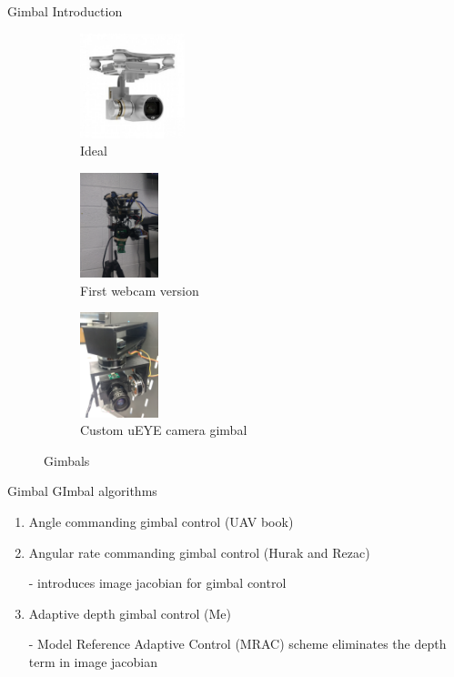 \documentclass[9pt]{beamer}
\newenvironment{figure*}%
{\begin{figure}}
{\end{figure}}
\begin{document}
\begin{frame}{Gimbal}
Introduction
	\begin{figure}[htbp]
	\centering
	\begin{subfigure}[t]{0.3\textwidth}
		\centering
		\includegraphics[height=1.2in]{phantom3_gimbal.jpg}
		\caption{Ideal}
	\end{subfigure}%
	\begin{subfigure}[t]{0.3\textwidth}
		\centering
		\includegraphics[height=1.2in]{chapter2/gimbal_webcam.jpg}
		\caption{First webcam version}
	\end{subfigure}
	\begin{subfigure}[t]{0.3\textwidth}
		\centering
		\includegraphics[height=1.2in]{chapter2/gimbal.jpg}
		\caption{Custom uEYE camera gimbal}
	\end{subfigure}
	\caption{Gimbals}
	\end{figure}
\end{frame}

\begin{frame}{Gimbal}
	GImbal algorithms
	\begin{enumerate}
		\item Angle commanding gimbal control (UAV book)
		\item Angular rate commanding gimbal control (Hurak and Rezac)
		
		 - introduces image jacobian for gimbal control
		\item Adaptive depth gimbal control (Me)
		
		 - Model Reference Adaptive Control (MRAC) scheme eliminates the depth term in image jacobian
	\end{enumerate}
\end{frame}
\end{document}
